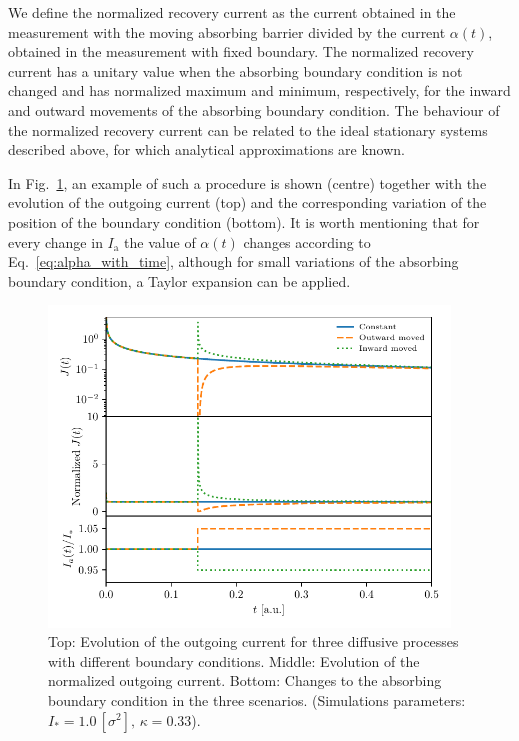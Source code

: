 {We define the normalized recovery current as the current obtained in the measurement with the moving absorbing barrier divided by the current $\alpha(t)$, obtained in the measurement with fixed boundary. The normalized recovery current has a unitary value when the absorbing boundary condition is not changed and has normalized maximum and minimum, respectively, for the inward and outward movements of the absorbing boundary condition. The behaviour of the normalized recovery current can be related to the ideal stationary systems described above, for which analytical approximations are known.

In Fig.~\ref{fig:fixed-vs-moved-boundary}, an example of such a procedure is shown (centre) together with the evolution of the outgoing current (top) and the corresponding variation of the position of the boundary condition (bottom). It is worth mentioning that for every change in $I_\mathrm{a}$ the value of $\alpha(t)$ changes according to Eq.~\eqref{eq:alpha_with_time}, although for small variations of the absorbing boundary condition, a Taylor expansion can be applied.

\begin{figure}[t]
    \centering
    \includegraphics[width=0.95\textwidth]{4_probing_the_diffusive_behavior/figs/final/global_vs_moving_current.pdf}
    \caption{Top: Evolution of the outgoing current for three diffusive processes with different boundary conditions. Middle: Evolution of the normalized outgoing current. Bottom: Changes to the absorbing boundary condition in the three scenarios. (Simulations parameters: $I_\ast = 1.0\,[\sigma^2], \, \kappa = 0.33$).}
    \label{fig:fixed-vs-moved-boundary}
\end{figure}

}
